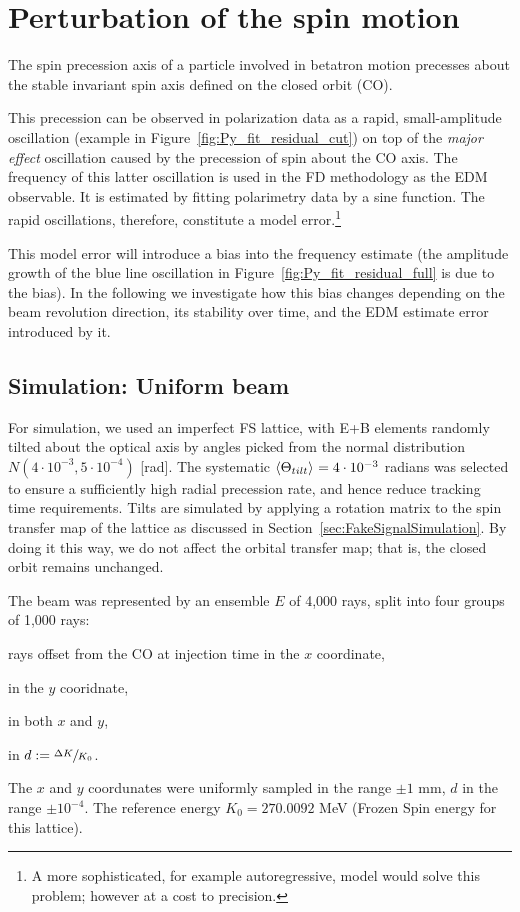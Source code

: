 \documentclass{article}
\begin{document}
\section{Perturbation of the spin motion}
The spin precession axis of a particle involved in betatron motion precesses about the stable invariant spin axis defined on the closed orbit (CO).

This precession can be observed in polarization data as a rapid, small-amplitude oscillation (example in Figure~\ref{fig:Py_fit_residual_cut}) on top of the \emph{major effect} oscillation caused by the precession of spin about the CO axis. The frequency of this latter oscillation is used in the FD methodology as the EDM observable. It is estimated by fitting polarimetry data by a sine function. The rapid oscillations, therefore, constitute a model error.\footnote{A more sophisticated, for example autoregressive, model would solve this problem; however at a cost to precision.}

This model error will introduce a bias into the frequency estimate (the amplitude growth of the blue line oscillation in Figure~\ref{fig:Py_fit_residual_full} is due to the bias). In the following we investigate how this bias changes depending on the beam revolution direction, its stability over time, and the EDM estimate error introduced by it.

\subsection{Simulation: Uniform beam}
For simulation, we used an imperfect FS lattice, with E+B elements randomly tilted about the optical axis by angles picked from the normal distribution $N(4\cdot 10^{-3}, 5\cdot10^{-4})$ [rad]. The systematic $\avg{\Theta_{tilt}} = 4\cdot 10^{-3}$ radians was selected to ensure a sufficiently high radial precession rate, and hence reduce tracking time requirements. Tilts are simulated by applying a rotation matrix to the spin transfer map of the lattice as discussed in Section~\ref{sec:FakeSignalSimulation}. By doing it this way, we do not affect the orbital transfer map; that is, the closed orbit remains unchanged.

The beam was represented by an ensemble $E$ of 4,000 rays, split into four groups of 1,000 rays:
\begin{inparaenum}[1)]
\item rays offset from the CO at injection time in the $x$ coordinate,
\item in the $y$ cooridnate,
\item in both $x$ and $y$,
\item in $d := \sfrac{\Delta K}{K_0}$.
\end{inparaenum}
The $x$ and $y$ coordunates were uniformly sampled in the range $\pm 1$ mm, $d$ in the range $\pm 10^{-4}$. The reference energy $K_0 = 270.0092$ MeV (Frozen Spin energy for this lattice).
\end{document}
